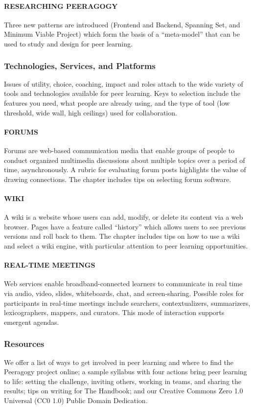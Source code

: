  \paragraph{RESEARCHING PEERAGOGY} Three new patterns are introduced
(Frontend and Backend, Spanning Set, and Minimum Viable Project) which
form the basis of a ``meta-model'' that can be used to study and
design for peer learning.

\subsubsection{Technologies, Services, and Platforms}

Issues of utility, choice, coaching, impact and roles attach to the wide
variety of tools and technologies available for peer learning. Keys to
selection include the features you need, what people are already using,
and the type of tool (low threshold, wide wall, high ceilings) used for
collaboration.

 \paragraph{FORUMS} Forums are web-based communication media
that enable groups of people to conduct organized multimedia discussions
about multiple topics over a period of time, asynchronously. A rubric
for evaluating forum posts highlights the value of drawing connections.
The chapter includes tips on selecting forum software.

 \paragraph{WIKI} A
wiki is a website whose users can add, modify, or delete its content via
a web browser. Pages have a feature called ``history'' which allows
users to see previous versions and roll back to them. The chapter
includes tips on how to use a wiki and select a wiki engine, with
particular attention to peer learning opportunities.

 \paragraph{REAL-TIME MEETINGS} Web services enable broadband-connected
learners to communicate in real time via audio, video, slides,
whiteboards, chat, and screen-sharing. Possible roles for participants
in real-time meetings include searchers, contextualizers, summarizers,
lexicographers, mappers, and curators. This mode of interaction
supports emergent agendas.

\subsubsection{Resources}

We offer a list of ways to get involved in peer learning and where to
find the Peeragogy project online; a sample syllabus with four actions
bring peer learning to life: setting the challenge, inviting others,
working in teams, and sharing the results; tips on writing for The
Handbook; and our Creative Commons Zero 1.0 Universal (CC0 1.0) Public
Domain Dedication.
